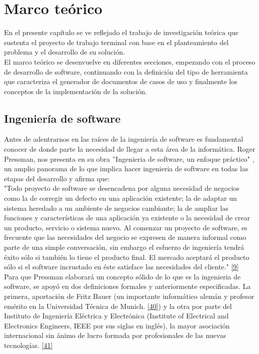 \chapter{Marco teórico} \label{cap:tres}

En el presente capítulo se ve reflejado el trabajo de investigación teórica que sustenta el proyecto de trabajo terminal con base en el planteamiento del problema y el desarrollo de su solución.\\

El marco teórico se desenvuelve en diferentes secciones, empezando con el proceso de desarrollo de software, continuando con la definición del tipo de herramienta que caracteriza el generador de documentos de casos de uso y finalmente los conceptos de la implementación de la solución.

\section{Ingeniería de software}

Antes de adentrarnos en las raíces de la ingeniería de software es fundamental conocer de donde parte la necesidad de llegar a esta área de la informática. Roger Pressman, nos presenta en su obra ''Ingenieria de software, un enfoque práctico" , un amplio panorama de lo que implica hacer ingenieria de software en todas las etapas del desarrollo y afirma que:\\ 

"Todo proyecto de software se desencadena por alguna necesidad de negocios como la de corregir un defecto en una aplicación existente; la de adaptar un sistema heredado a un ambiente de negocios cambiante; la de ampliar las funciones y características de una aplicación ya existente o la necesidad de crear un producto, servicio o sistema nuevo. Al comenzar un proyecto de software, es frecuente que las necesidades del negocio se expresen de manera informal como parte de una simple conversación, sin embargo el esfuerzo de ingeniería tendrá éxito sólo si también lo tiene el producto final. El mercado aceptará el producto sólo si el software incrustado en éste satisface las necesidades del cliente." \hyperlink{b09}{[9]}\\

Para que Pressman elaborará un concepto sólido de lo que es la ingenieria de software, se apoyó en dos definiciones formales y anteriormente especificadas. La primera, aportación de Fritz Bauer (un importante informático alemán y profesor emérito en la Universidad Técnica de Munich. \hyperlink{b40}{[40]}) y la otra por parte del Instituto de Ingeniería Eléctrica y Electrónica (Institute of Electrical and Electronics Engineers,  IEEE por sus siglas en inglés), la mayor asociación internacional sin ánimo de lucro formada por profesionales de las nuevas tecnologías. \hyperlink{b41}{[41]} \\

